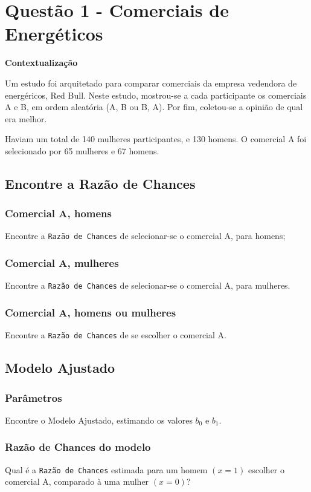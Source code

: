 \documentclass[11pt]{article}
\date{\today}
\title{}
\begin{document}
\tableofcontents

\section{Questão 1 - Comerciais de Energéticos}
\label{sec:org4b7dd1e}
\textbf{Contextualização}

Um estudo foi arquitetado para comparar comerciais da empresa
vedendora de energéricos, Red Bull. Neste estudo, mostrou-se a cada
participante os comerciais A e B, em ordem aleatória (A, B ou B,
A). Por fim, coletou-se a opinião de qual era melhor.

Haviam um total de 140 mulheres participantes, e 130 homens. O
comercial A foi selecionado por 65 mulheres e 67 homens.

\subsection{Encontre a Razão de Chances}
\label{sec:org1855af3}
\subsubsection{Comercial A, homens}
\label{sec:org468c52f}
Encontre a \texttt{Razão de Chances} de selecionar-se o comercial A, para
homens;
\subsubsection{Comercial A, mulheres}
\label{sec:org65784a2}
Encontre a \texttt{Razão de Chances} de selecionar-se o comercial A, para
mulheres.

\subsubsection{Comercial A, homens ou mulheres}
\label{sec:orgd9d8b79}
Encontre a \texttt{Razão de Chances} de se escolher o comercial A.


\subsection{Modelo Ajustado}
\label{sec:orga8aecc4}
\subsubsection{Parâmetros}
\label{sec:org8a59dea}
Encontre o Modelo Ajustado, estimando os valores \(b_0\) e \(b_1\).
\subsubsection{Razão de Chances do modelo}
\label{sec:org277fdbf}
Qual é a \texttt{Razão de Chances} estimada para um homem \((x=1)\) escolher o
comercial A, comparado à uma mulher \((x=0)\)?
\end{document}
